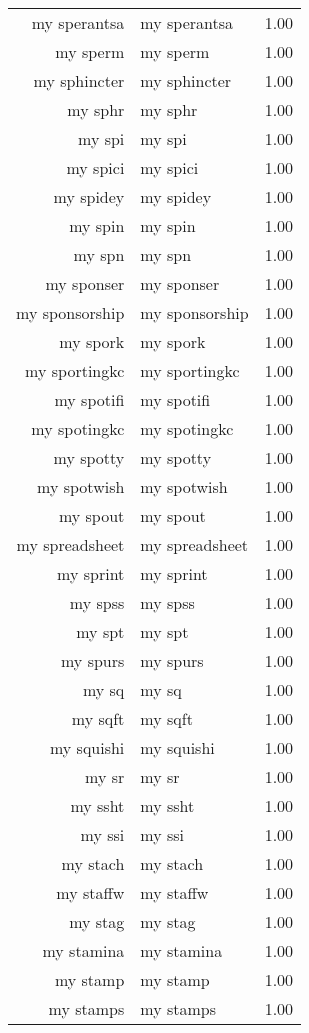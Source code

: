 \begin{table}[ht]
\begin{tabular}{rlr}
  my sperantsa & my sperantsa & 1.00 \\ 
  my sperm & my sperm & 1.00 \\ 
  my sphincter & my sphincter & 1.00 \\ 
  my sphr & my sphr & 1.00 \\ 
  my spi & my spi & 1.00 \\ 
  my spici & my spici & 1.00 \\ 
  my spidey & my spidey & 1.00 \\ 
  my spin & my spin & 1.00 \\ 
  my spn & my spn & 1.00 \\ 
  my sponser & my sponser & 1.00 \\ 
  my sponsorship & my sponsorship & 1.00 \\ 
  my spork & my spork & 1.00 \\ 
  my sportingkc & my sportingkc & 1.00 \\ 
  my spotifi & my spotifi & 1.00 \\ 
  my spotingkc & my spotingkc & 1.00 \\ 
  my spotty & my spotty & 1.00 \\ 
  my spotwish & my spotwish & 1.00 \\ 
  my spout & my spout & 1.00 \\ 
  my spreadsheet & my spreadsheet & 1.00 \\ 
  my sprint & my sprint & 1.00 \\ 
  my spss & my spss & 1.00 \\ 
  my spt & my spt & 1.00 \\ 
  my spurs & my spurs & 1.00 \\ 
  my sq & my sq & 1.00 \\ 
  my sqft & my sqft & 1.00 \\ 
  my squishi & my squishi & 1.00 \\ 
  my sr & my sr & 1.00 \\ 
  my ssht & my ssht & 1.00 \\ 
  my ssi & my ssi & 1.00 \\ 
  my stach & my stach & 1.00 \\ 
  my staffw & my staffw & 1.00 \\ 
  my stag & my stag & 1.00 \\ 
  my stamina & my stamina & 1.00 \\ 
  my stamp & my stamp & 1.00 \\ 
  my stamps & my stamps & 1.00 \\ 

\end{tabular}
\end{table}
